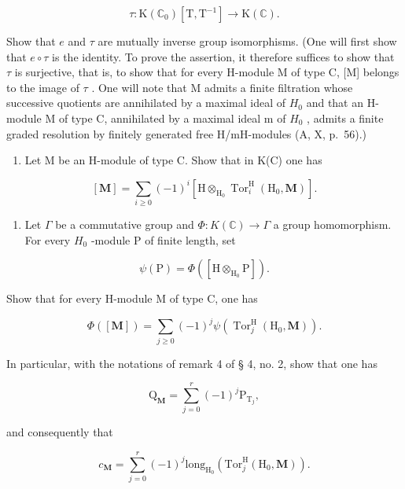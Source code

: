 \[
\tau : \mathrm{K} (\mathbb {C} _ {0}) [ \mathrm{T}, \mathrm{T} ^ {- 1} ] \rightarrow \mathrm{K} (\mathbb {C}).
\]

Show that \(e\) and \(\tau\) are mutually inverse group isomorphisms. (One will first show that \(e \circ \tau\) is the identity. To prove the assertion, it therefore suffices to show that \(\tau\) is surjective, that is, to show that for every H-module M of type C, {[}M{]} belongs to the image of \(\tau\) . One will note that M admits a finite filtration whose successive quotients are annihilated by a maximal ideal of \(H_0\) and that an H-module M of type C, annihilated by a maximal ideal m of \(H_0\) , admits a finite graded resolution by finitely generated free H/mH-modules (A, X, p.~56).)

\begin{enumerate}
\def\labelenumi{\alph{enumi})}
\setcounter{enumi}{4}
\tightlist
\item
  Let M be an H-module of type C. Show that in K(C) one has
\end{enumerate}

\[
[ \mathbf {M} ] = \sum_ {i \geqslant 0} (- 1) ^ {i} [ \mathrm{H} \otimes_ {\mathrm{H} _ {0}} \operatorname{Tor} _ {i} ^ {\mathrm{H}} (\mathrm{H} _ {0}, \mathbf {M}) ].
\]

\begin{enumerate}
\def\labelenumi{\alph{enumi})}
\setcounter{enumi}{5}
\tightlist
\item
  Let \(\Gamma\) be a commutative group and \(\Phi : K(\mathbb{C}) \to \Gamma\) a group homomorphism. For every \(H_0\) -module P of finite length, set
\end{enumerate}

\[
\psi (\mathrm{P}) = \Phi ([ \mathrm{H} \otimes_ {\mathrm{H} _ {0}} \mathrm{P} ]).
\]

Show that for every H-module M of type C, one has

\[
\Phi ([ \mathbf {M} ]) = \sum_ {j \geqslant 0} (- 1) ^ {j} \psi (\operatorname{Tor} _ {j} ^ {\mathrm{H}} (\mathrm{H} _ {0}, \mathbf {M})).
\]

In particular, with the notations of remark 4 of § 4, no. 2, show that one has

\[
\mathrm{Q} _ {\mathbf {M}} = \sum_ {j = 0} ^ {r} (- 1) ^ {j} \mathrm{P} _ {\mathrm{T} _ {j}},
\]

and consequently that

\[
c _ {\mathbf {M}} = \sum_ {j = 0} ^ {r} (- 1) ^ {j} \mathrm{long} _ {\mathrm{H} _ {0}} (\mathrm{Tor} _ {j} ^ {\mathrm{H}} (\mathrm{H} _ {0}, \mathbf {M})).
\]

